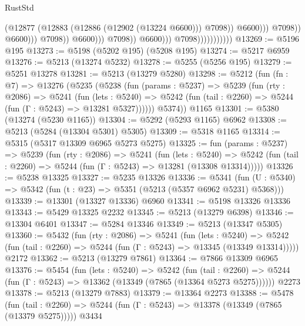 \begin{lexlean}{RustStd}
\begin{coremodule}
                                                              (@12877
                                                                (@12883
                                                                  (@12886 (@12902 (@13224 @6600)))
                                                                  @7098))
                                                              @6600)))
                                                        @7098))
                                                    @6600)))
                                              @7098))
                                          @6600)))
                                    @7098))
                                @6600)))
                          @7098)))))))))))
@13269 := @5196 @195
@13273 := @5198 (@5202 @195) (@5208 @195)
@13274 := @5217 @6959
@13276 := @5213 (@13274 @5232)
@13278 := @5255 (@5256 @195)
@13279 := @5251 @13278
@13281 := @5213 (@13279 @5280)
@13298 := @5212
    (fun (fn : @7) =>
    @13276
      (@5235
        (@5238
          (fun (params : @5237) =>
          @5239
            (fun (rty : @2086) =>
            @5241
              (fun (lets : @5240) =>
              @5242 (fun (tail : @2260) => @5244 (fun (Γ : @5243) => @13281 @5327))))))
        @5374))
    @1165
@13301 := @5380 (@13274 (@5230 @1165))
@13304 := @5292 (@5293 @1165) @6962
@13308 := @5213 (@5284 (@13304 @5301) @5305)
@13309 := @5318 @1165
@13314 := @5315 (@5317 @13309 @6965 @5273 @5275)
@13325 := fun (params : @5237) =>
  @5239
    (fun (rty : @2086) =>
    @5241
      (fun (lets : @5240) =>
      @5242 (fun (tail : @2260) => @5244 (fun (Γ : @5243) => @13281 (@13308 @13314)))))
@13326 := @5238 @13325
@13327 := @5235 @13326
@13336 := @5341
    (fun (U : @5340) => @5342 (fun (t : @23) => @5351 (@5213 (@5357 @6962 @5231) @5368)))
@13339 := @13301 (@13327 @13336) @6960
@13341 := @5198 @13326 @13336
@13343 := @5429 @13325 @2232
@13345 := @5213 (@13279 @6398)
@13346 := @13304 @6401
@13347 := @5284 @13346
@13349 := @5213 (@13347 @5305)
@13360 := @5432
    (fun (rty : @2086) =>
    @5241
      (fun (lets : @5240) =>
      @5242 (fun (tail : @2260) => @5244 (fun (Γ : @5243) => @13345 (@13349 @13314)))))
    @2172
@13362 := @5213 (@13279 @7861)
@13364 := @7866 @13309 @6965
@13376 := @5454
    (fun (lets : @5240) =>
    @5242
      (fun (tail : @2260) =>
      @5244 (fun (Γ : @5243) => @13362 (@13349 (@7865 (@13364 @5273 @5275))))))
    @2273
@13378 := @5213 (@13279 @7883)
@13379 := @13364 @2273
@13388 := @5478
    (fun (tail : @2260) => @5244 (fun (Γ : @5243) => @13378 (@13349 (@7865 (@13379 @5275)))))
    @3434

\end{coremodule}
\end{lexlean}
